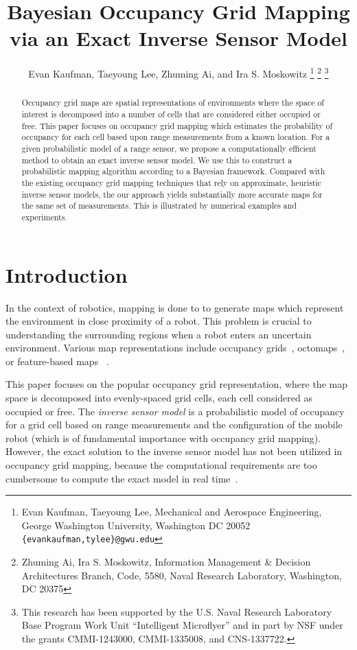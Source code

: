 \documentclass[letterpaper, 10pt, conference]{ieeeconf}
\title{\LARGE \bf
Bayesian Occupancy Grid Mapping via an Exact Inverse Sensor Model}
\author{Evan Kaufman, Taeyoung Lee, Zhuming Ai, and Ira S. Moskowitz%
\thanks{Evan Kaufman, Taeyoung Lee, Mechanical and Aerospace Engineering, George Washington University, Washington DC 20052 {\tt \{evankaufman,tylee\}@gwu.edu}}
\thanks{Zhuming Ai, Ira S. Moskowitz, Information Management \& Decision Architectures Branch, Code, 5580,  Naval Research Laboratory,  Washington, DC 20375}
\thanks{This research has been supported by the U.S. Naval Research Laboratory Base Program Work Unit ``Intelligent Microflyer'' and in part by NSF under the grants CMMI-1243000, CMMI-1335008, and CNS-1337722.}
}
\begin{document}
\allowdisplaybreaks


\maketitle \thispagestyle{empty} \pagestyle{empty}

\begin{abstract}
Occupancy grid maps are spatial representations of environments where the space of interest is decomposed into a number of cells that are considered either occupied or free. This paper focuses on occupancy grid mapping which   estimates the probability of occupancy for each cell based upon range measurements from a known location. For a given probabilistic model of a range sensor, we propose a computationally efficient method to obtain an exact inverse sensor model. We use this to   construct a probabilistic mapping algorithm according to a Bayesian framework. Compared with the existing occupancy grid mapping techniques that rely on approximate, heuristic inverse sensor models, the our approach yields substantially more accurate maps for the same set of measurements. This is illustrated by numerical examples and experiments. 
\end{abstract}

\section{Introduction}

In the context of robotics, mapping is done to    to generate maps which represent the environment in close proximity of a robot. This problem is crucial to understanding the surrounding regions when a robot enters an uncertain environment.
Various map representations include occupancy grids~\cite{WolSuk05}, octomaps~\cite{WurHorBenStaBur10}, or feature-based maps%
~\cite{MonThrKolWeg02}.

This paper focuses on the popular occupancy grid representation, where the map space is decomposed into evenly-spaced grid cells, each cell considered as  occupied or free.
The \emph{inverse sensor model} is a probabilistic model  of occupancy for a grid cell based on range measurements and the configuration of the mobile robot (which is of fundamental importance with occupancy grid mapping). However, the exact solution to the inverse sensor model has not been utilized in occupancy grid mapping, because the computational requirements are too cumbersome to compute the exact model in real time~\cite{ThrBurFox05}.
\end{document}
